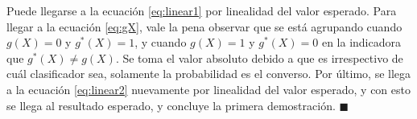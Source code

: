     Puede llegarse a la ecuación \ref{eq:linear1} por linealidad del valor esperado. 
    Para llegar a la ecuación \ref{eq:gX}, vale la pena observar que se está agrupando cuando $g(X)=0$ y $g^*(X)=1$, y cuando $g(X)=1$ y $g^*(X)=0$ en la indicadora que $g^*(X)\ne g(X)$. Se toma el valor absoluto debido a que es irrespectivo de cuál clasificador sea, solamente la probabilidad es el converso.
    Por último, se llega a la ecuación \ref{eq:linear2} nuevamente por linealidad del valor esperado, y con esto se llega
    al resultado esperado, y concluye la primera demostración. $\blacksquare$